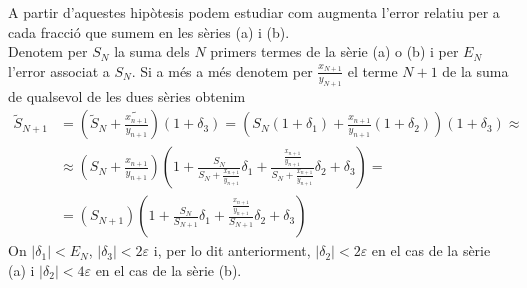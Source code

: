 \documentclass[a4paper,10pt]{article}
\renewcommand{\*}{\cdot}
\renewcommand{\epsilon}{\varepsilon}
\begin{document}
A partir d'aquestes hipòtesis podem estudiar com augmenta l'error relatiu per a cada fracció que sumem en les sèries (a) i (b).\\
Denotem per $S_N$ la suma dels $N$ primers termes de la sèrie (a) o (b) i per $E_N$ l'error associat a $S_N$. Si a més a més denotem per $\frac{x_{N+1}}{y_{N+1}}$ el terme
$N+1$ de la suma de qualsevol de les dues sèries obtenim
\begin{equation*}
\begin{split}
\tilde{S}_{N+1} &=\left(\tilde{S}_{N}+\tilde{\frac{x_{n+1}}{y_{n+1}}}\right)(1+\delta_3)=\left(S_N(1+\delta_1)+\frac{x_{n+1}}{y_{n+1}}(1+\delta_2)\right)(1+\delta_3)\approx\\
&\approx\left(S_N+\frac{x_{n+1}}{y_{n+1}}\right)\left(1+\frac{S_N}{S_N+\frac{x_{n+1}}{y_{n+1}}}\delta_1+\frac{\frac{x_{n+1}}{y_{n+1}}}{S_N+\frac{x_{n+1}}{y_{n+1}}}
\delta_2+\delta_3\right)=\\
&=(S_{N+1})\left(1+\frac{S_N}{S_{N+1}}\delta_1+\frac{\frac{x_{n+1}}{y_{n+1}}}{S_{N+1}}
\delta_2+\delta_3\right)
\end{split}
\end{equation*}
On $|\delta_1|<E_N$, $|\delta_3|<2\epsilon$ i, per lo dit anteriorment, $|\delta_2|<2\epsilon$ en el cas de la sèrie (a) i $|\delta_2|<4\epsilon$ en el cas de la sèrie (b).
\end{document}
